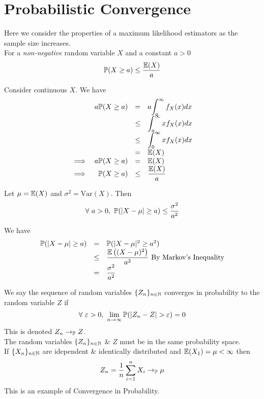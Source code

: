 \documentclass[11pt,a4paper]{article}
\begin{document}
\section{Probabilistic Convergence}

Here we consider the properties of a maximum likelihood estimators as the sample size increases.\\

For a \textit{non-negative} random variable $X$ and a constant $a>0$
$$\mathbb{P}(X\geq a)\leq\dfrac{\mathbb{E}(X)}{a}$$

Consider continuous $X$. We have
\[\begin{array}{rrcl}
&a\mathbb{P}(X\geq a)&=&a{\displaystyle\int_a^\infty f_X(x)dx}\\
&&\leq&{\displaystyle\int_a^\infty xf_X(x)dx}\\
&&\leq&{\displaystyle\int_0^\infty xf_X(x)dx}\\
&&=&\mathbb{E}(X)\\
\implies&a\mathbb{P}(X\geq a)&=&\mathbb{E}(X)\\
\implies&\mathbb{P}(X\geq a)&\leq&\dfrac{\mathbb{E}(X)}{a}
\end{array}\]
\proved

Let $\mu=\mathbb{E}(X)$ and $\sigma^2=\text{Var}(X)$. Then
$$\forall\ a>0,\ \mathbb{P}(|X-\mu|\geq a)\leq\dfrac{\sigma^2}{a^2}$$

We have
\[\begin{array}{rcl}
\mathbb{P}(|X-\mu|\geq a)&=&\mathbb{P}(|X-\mu|^2\geq a^2)\\
&\leq&\dfrac{\mathbb{E}\left((X-\mu)^2\right)}{a^2}\ \text{By Markov's Inequality}\\
&=&\dfrac{\sigma^2}{a^2}
\end{array}\]
\proved

We say the sequence of random variables $\{Z_n\}_{n\in\mathbb{N}}$ converges in probability to the random variable $Z$ if
$$\forall\ \varepsilon>0,\ \lim_{n\to\infty}\prob(|Z_n-Z|>\varepsilon)=0$$
\nb This is denoted $Z_n\to_{\mathbb{P}} Z$.\\
\nb The random variables $\{Z_n\}_{n\in\mathbb{N}}$ \& $Z$ must be in the same probability space.\\

If $\{X_n\}_{n\in\mathbb{N}}$ are idependent \& identically distributed and $\mathbb{E}(X_1)=\mu<\infty$ then
$$Z_n=\frac{1}{n}\sum_{i=1}^nX_i\to_{\mathbb{P}}\mu$$
\nb This is an example of Convergence in Probability.\\
\end{document}
